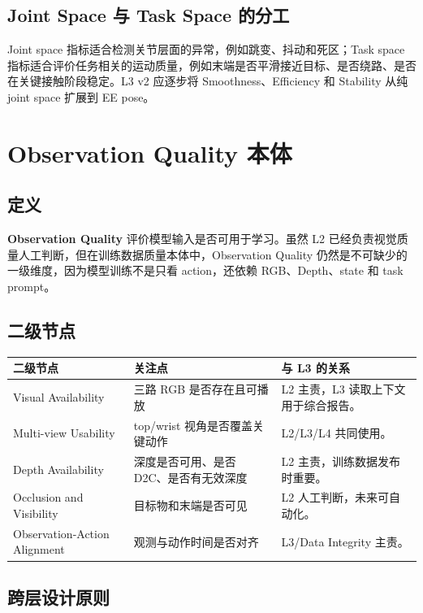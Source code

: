 \documentclass[UTF8,zihao=-4]{ctexart}
\newcommand{\Term}[1]{\textbf{#1}}
\begin{document}
\subsection{Joint Space 与 Task Space 的分工}

Joint space 指标适合检测关节层面的异常，例如跳变、抖动和死区；Task space 指标适合评价任务相关的运动质量，例如末端是否平滑接近目标、是否绕路、是否在关键接触阶段稳定。L3 v2 应逐步将 Smoothness、Efficiency 和 Stability 从纯 joint space 扩展到 EE pose。

\section{Observation Quality 本体}

\subsection{定义}

\Term{Observation Quality} 评价模型输入是否可用于学习。虽然 L2 已经负责视觉质量人工判断，但在训练数据质量本体中，Observation Quality 仍然是不可缺少的一级维度，因为模型训练不是只看 action，还依赖 RGB、Depth、state 和 task prompt。

\subsection{二级节点}

\begin{longtable}{L{3.2cm} L{5cm} L{5.5cm}}
\toprule
二级节点 & 关注点 & 与 L3 的关系 \\
\midrule
Visual Availability & 三路 RGB 是否存在且可播放 & L2 主责，L3 读取上下文用于综合报告。 \\
Multi-view Usability & top/wrist 视角是否覆盖关键动作 & L2/L3/L4 共同使用。 \\
Depth Availability & 深度是否可用、是否 D2C、是否有无效深度 & L2 主责，训练数据发布时重要。 \\
Occlusion and Visibility & 目标物和末端是否可见 & L2 人工判断，未来可自动化。 \\
Observation-Action Alignment & 观测与动作时间是否对齐 & L3/Data Integrity 主责。 \\
\bottomrule
\end{longtable}

\subsection{跨层设计原则}
\end{document}
